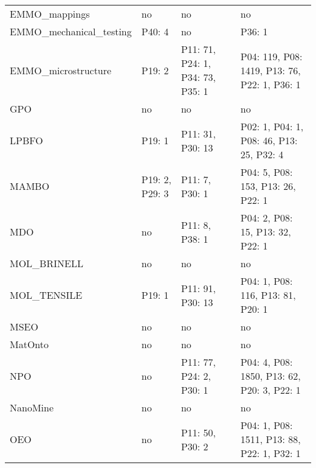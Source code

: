 \begin{tabular}{m{4cm}m{3cm}m{3cm}m{5cm}}
          EMMO_mappings &                      no &                                       no &                                                no \\
EMMO_mechanical_testing &                  P40: 4 &                                       no &                                            P36: 1 \\
    EMMO_microstructure &                  P19: 2 &         P11: 71, P24: 1, P34: 73, P35: 1 &      P04: 119, P08: 1419, P13: 76, P22: 1, P36: 1 \\
                    GPO &                      no &                                       no &                                                no \\
                  LPBFO &                  P19: 1 &                         P11: 31, P30: 13 &          P02: 1, P04: 1, P08: 46, P13: 25, P32: 4 \\
                  MAMBO &          P19: 2, P29: 3 &                           P11: 7, P30: 1 &                 P04: 5, P08: 153, P13: 26, P22: 1 \\
                    MDO &                      no &                           P11: 8, P38: 1 &                  P04: 2, P08: 15, P13: 32, P22: 1 \\
            MOL_BRINELL &                      no &                                       no &                                                no \\
            MOL_TENSILE &                  P19: 1 &                         P11: 91, P30: 13 &                 P04: 1, P08: 116, P13: 81, P20: 1 \\
                   MSEO &                      no &                                       no &                                                no \\
                MatOnto &                      no &                                       no &                                                no \\
                    NPO &                      no &                  P11: 77, P24: 2, P30: 1 &        P04: 4, P08: 1850, P13: 62, P20: 3, P22: 1 \\
               NanoMine &                      no &                                       no &                                                no \\
                    OEO &                      no &                          P11: 50, P30: 2 &        P04: 1, P08: 1511, P13: 88, P22: 1, P32: 1 \\

\end{tabular}
